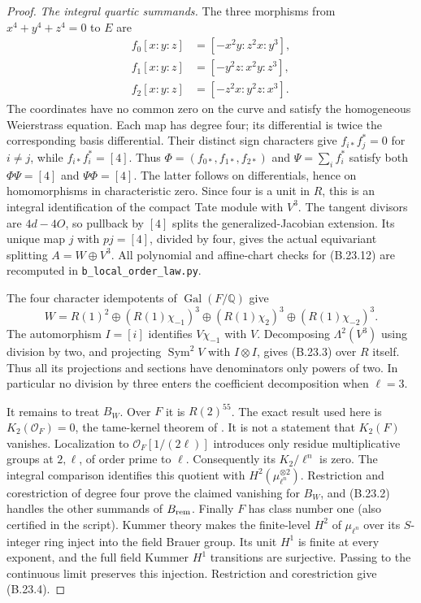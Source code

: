 \begin{proof}
\emph{The integral quartic summands.}
The three morphisms from $x^4+y^4+z^4=0$ to $E$ are
\[
 \begin{split}
 f_0[x:y:z]&=[-x^2y:z^2x:y^3],\\
 f_1[x:y:z]&=[-y^2z:x^2y:z^3],\\
 f_2[x:y:z]&=[-z^2x:y^2z:x^3].
 \end{split}                                                    \tag{B.23.12}
\]
The coordinates have no common zero on the curve and satisfy
the homogeneous Weierstrass equation. Each map has degree
four; its differential is twice the corresponding basis
differential. Their distinct sign characters give
$f_{i*}f_j^*=0$ for $i\ne j$, while $f_{i*}f_i^*=[4]$.
Thus $\Phi=(f_{0*},f_{1*},f_{2*})$ and
$\Psi=\sum_i f_i^*$ satisfy both $\Phi\Psi=[4]$ and
$\Psi\Phi=[4]$. The latter follows on differentials, hence
on homomorphisms in characteristic zero.
Since four is a unit in $R$, this is an integral
identification of the compact Tate module with $V^3$.
The tangent divisors are $4d-4O$, so pullback by $[4]$
splits the generalized-Jacobian extension. Its unique
map $j$ with $pj=[4]$, divided by four, gives the actual
equivariant splitting $A=W\oplus V^3$.
All polynomial and affine-chart checks for (B.23.12) are
recomputed in \texttt{b\_local\_order\_law.py}.

The four character idempotents of $\operatorname{Gal}(F/\mathbb Q)$
give
\[
 W=R(1)^2\oplus(R(1)\chi_{-1})^3
       \oplus(R(1)\chi_2)^3\oplus(R(1)\chi_{-2})^3.
\]
The automorphism $I=[i]$ identifies $V\chi_{-1}$ with $V$.
Decomposing $\Lambda^2(V^3)$ using division by two,
and projecting $\operatorname{Sym}^2V$ with
$I\otimes I$, gives (B.23.3) over $R$ itself.
Thus all its projections and sections have denominators
only powers of two. In particular no division by three
enters the coefficient decomposition when $\ell=3$.

It remains to treat $B_W$. Over $F$ it is $R(2)^{55}$.
The exact result used here is
$K_2(\mathcal O_F)=0$, the tame-kernel theorem of
\citet[Theorem 3.5]{BGuoQinSong2003}.
It is not a statement that $K_2(F)$ vanishes.
Localization to $\mathcal O_F[1/(2\ell)]$ introduces only
residue multiplicative groups at $2,\ell$, of order prime
to $\ell$. Consequently its $K_2/\ell^n$ is zero.
The integral comparison
\citep[Proposition A2.1]{BKahn1993}
identifies this quotient with $H^2(\mu_{\ell^n}^{\otimes2})$.
Restriction and corestriction of degree four prove the
claimed vanishing for $B_W$, and (B.23.2) handles the
other summands of $B_{\rm rem}$.
Finally $F$ has class number one (also certified in the
script). Kummer theory makes the finite-level $H^2$ of
$\mu_{\ell^n}$ over its $S$-integer ring inject into
the field Brauer group. Its unit $H^1$ is finite at
every exponent, and the full field Kummer $H^1$
transitions are surjective. Passing to the continuous
limit preserves this injection. Restriction and
corestriction give (B.23.4).
\end{proof}

